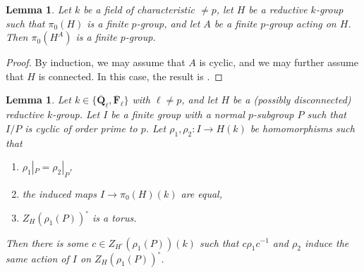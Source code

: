 \documentclass[reqno]{amsart}
\numberwithin{equation}{subsection}
\DeclareRobustCommand{\sean}[1]{{\color{red}\sffamily $\heartsuit\heartsuit\heartsuit$ SEAN: [#1]}}
\newcommand{\F}{\mathbf{F}}
\newcommand{\Q}{\mathbf{Q}}
\newcommand{\ol}[1]{\overline{#1}}
\newcommand{\co}{\colon}
\DeclareMathOperator{\der}{der}
\newtheorem{lemma}[thm]{Lemma}
\theoremstyle{remark}
\numberwithin{equation}{subsection}
\numberwithin{figure}{subsection}
\begin{document}

\begin{lemma}\label{lemma:wild-centralizer-components}
Let $k$ be a field of characteristic $\neq p$, let $H$ be a reductive $k$-group such that $\pi_0(H)$ is a finite $p$-group, and let $A$ be a finite $p$-group acting on $H$. Then $\pi_0(H^A)$ is a finite $p$-group.
\end{lemma}

\begin{proof}
By induction, we may assume that $A$ is cyclic, and we may further assume that $H$ is connected. In this case, the result is \cite[Corollary 2.16(b)]{St75}.
\end{proof}


\begin{lemma}\label{lemma:align-tame-components}
Let $k \in \{\ol\Q_\ell, \ol\F_\ell\}$ with $\ell\ne p$, and let $H$ be a (possibly disconnected) reductive $k$-group. Let $I$ be a finite group with a normal $p$-subgroup $P$ such that $I/P$ is cyclic of order prime to $p$. Let $\rho_1,\rho_2\co I\to H(k)$ be homomorphisms such that
\begin{enumerate}
    \item $\rho_1|_P = \rho_2|_P$,
    \item the induced maps $I \to \pi_0(H)(k)$ are equal,
    \item $Z_H(\rho_1(P))^\circ$ is a torus.
\end{enumerate}
Then there is some $c\in Z_{H^\circ}(\rho_1(P))(k)$ such that $c\rho_1c^{-1}$ and $\rho_2$ induce the same action of $I$ on $Z_H(\rho_1(P))^\circ$.
\end{lemma}
\end{document}
